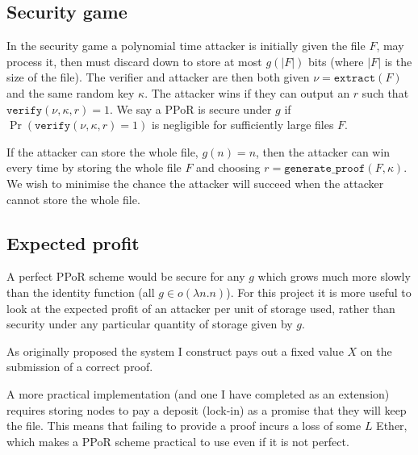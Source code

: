 \documentclass[12pt,a4paper,twoside,openright]{report}
\begin{document}
\subsection{Security game}

In the security game a polynomial time attacker is initially given the file $F$, may process it, then must discard down to store at most $g(|F|)$ bits (where $|F|$ is the size of the file).
The verifier and attacker are then both given $\nu = \texttt{extract}(F)$ and the same random key $\kappa$.
The attacker wins if they can output an $r$ such that $\texttt{verify}(\nu, \kappa, r) = 1$.
We say a PPoR is secure under $g$ if $\Pr (\texttt{verify}(\nu, \kappa, r) = 1)$ is negligible for sufficiently large files $F$.

If the attacker can store the whole file, $g(n) = n$, then the attacker can win every time by storing the whole file $F$ and choosing $r = \texttt{generate\_proof}(F, \kappa)$.
We wish to minimise the chance the attacker will succeed when the attacker cannot store the whole file.


\subsection{Expected profit}

A perfect PPoR scheme would be secure for any $g$ which grows much more slowly than the identity function (all $g \in o(\lambda n. n)$).
For this project it is more useful to look at the expected profit of an attacker per unit of storage used,
rather than security under any particular quantity of storage given by $g$.

As originally proposed the system I construct pays out a fixed value $X$ on the submission of a correct proof.

A more practical implementation (and one I have completed as an extension) requires storing nodes to pay a deposit (lock-in)
as a promise that they will keep the file. This means that failing to provide a proof incurs a loss of some $L$ Ether,
which makes a PPoR scheme practical to use even if it is not perfect.


%
\end{document}
